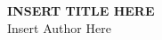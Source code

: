 \documentclass[aspectratio=169]{beamer}
\begin{document}
\newcommand{\mytitle}{INSERT TITLE HERE}
\newcommand{\myauthor}{Insert Author Here}
\begin{frame}[plain, t]
\vspace*{0.5\paperheight}\LARGE
\textbf{\mytitle}\\\large
\myauthor
\end{frame}
\end{document}
